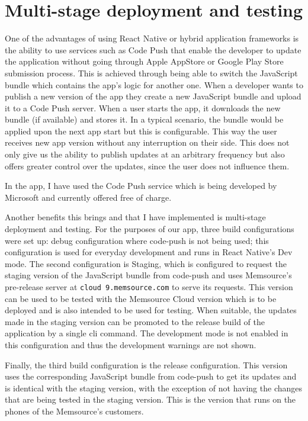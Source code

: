 \section{Multi-stage deployment and testing}


One of the advantages of using React Native or hybrid application frameworks is the ability to use services such as Code Push that enable the developer to update the application without going through Apple AppStore or Google Play Store submission process. This is achieved through being able to switch the JavaScript bundle which contains the app’s logic for another one. When a developer wants to publish a new version of the app they create a new JavaScript bundle and upload it to a Code Push server. 
When a user starts the app, it downloads the new bundle (if available) and stores it. In a typical scenario, the bundle would be applied upon the next app start but this is configurable. This way the user receives new app version without any interruption on their side. This does not only give us the ability to publish updates at an arbitrary frequency but also offers greater control over the updates, since the user does not influence them.


In the app, I have used the Code Push service which is being developed by Microsoft and currently offered free of charge. 


Another benefits this brings and that I have implemented is multi-stage deployment and testing. For the purposes of our app, three build configurations were set up: debug configuration where code-push is not being used; this configuration is used for everyday development and runs in React Native’s Dev mode. 
The second configuration is Staging, which is configured to request the staging version of the JavaScript bundle from code-push and uses Memsource’s pre-release server at \texttt{cloud 9.memsource.com} to serve its requests. This version can be used to be tested with the Memsource Cloud version which is to be deployed and is also intended to be used for testing. When suitable, the updates made in the staging version can be promoted to the release build of the application by a single cli command. The development mode is not enabled in this configuration and thus the development warnings are not shown. 


Finally, the third build configuration is the release configuration. This version uses the corresponding JavaScript bundle from code-push to get its updates and is identical with the staging version, with the exception of not having the changes that are being tested in the staging version. This is the version that runs on the phones of the Memsource’s customers.



